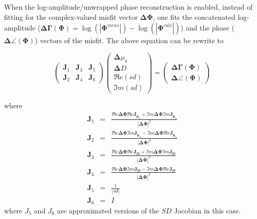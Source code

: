 \documentclass[12pt]{book}               %
\begin{document}
When the log-amplitude/unwrapped phase reconstruction is enabled, instead of fitting for 
the complex-valued misfit vector $\boldsymbol{\Delta\Phi}$, one fits the concatenated log-amplitude ($\boldsymbol{\Delta\Gamma(\Phi)}=\log(|\boldsymbol{\Phi}^{meas}|)-\log(|\boldsymbol{\Phi}^{calc}|)$) and the phase ($\boldsymbol{\Delta\angle(\Phi)}$)
vectors of the misfit. The above equation can be rewrite to

\begin{equation}\label{eq:logphase}
\left(
\begin{array}{lll}
\mathbf{J}_1 & \mathbf{J}_3 & \mathbf{J}_5\\
\mathbf{J}_2 & \mathbf{J}_4 & \mathbf{J}_6
\end{array}\right)
\left(
\begin{array}{l}
\boldsymbol{\Delta}{\mu_a}\\
\boldsymbol{\Delta}{D}\\
\Re e({sd})\\
\Im m({sd})
\end{array}
\right)=\left(
\begin{array}{l}
{\boldsymbol{\Delta\Gamma(\Phi)}}\\
{\boldsymbol{\Delta\angle(\Phi)}}
\end{array}\right)
\end{equation}

where
\begin{eqnarray}\nonumber
\mathbf{J}_1&=&\frac{\Re e{\boldsymbol{\Delta\Phi}}\Re e{\boldsymbol{\mathbf{J}_{\mu_a}}}
+\Im m{\boldsymbol{\Delta\Phi}}\Im m{\boldsymbol{\mathbf{J}_{\mu_a}}} }{|\boldsymbol{\Delta\Phi}|^2} \\\nonumber
\mathbf{J}_2&=&\frac{\Re e{\boldsymbol{\Delta\Phi}}\Im m{\boldsymbol{\mathbf{J}_{\mu_a}}}
-\Im m{\boldsymbol{\Delta\Phi}}\Re e{\boldsymbol{\mathbf{J}_{\mu_a}}} }{|\boldsymbol{\Delta\Phi}|^2} \\
\mathbf{J}_3&=&\frac{\Re e{\boldsymbol{\Delta\Phi}}\Re e{\boldsymbol{\mathbf{J}_{D}}}
+\Im m{\boldsymbol{\Delta\Phi}}\Im m{\boldsymbol{\mathbf{J}_{D}}} }{|\boldsymbol{\Delta\Phi}|^2} \\\nonumber
\mathbf{J}_4&=&\frac{\Re e{\boldsymbol{\Delta\Phi}}\Im m{\boldsymbol{\mathbf{J}_{D}}}
-\Im m{\boldsymbol{\Delta\Phi}}\Re e{\boldsymbol{\mathbf{J}_{D}}} }{|\boldsymbol{\Delta\Phi}|^2} \\\nonumber
\mathbf{J}_5&=& \frac{1}{|sd|} \\\nonumber
\mathbf{J}_6&=& I \nonumber
\end{eqnarray}
where $J_5$ and $J_6$ are approximated versions of the $SD$ Jacobian in this case.
\end{document}
